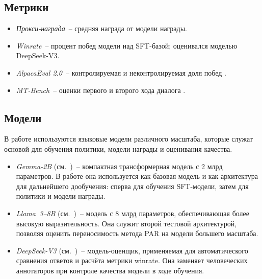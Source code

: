 \subsection{Метрики}

\begin{itemize}
    \item \emph{Прокси-награда}~-- средняя награда от модели награды.
    \item \emph{Winrate}~-- процент побед модели над SFT-базой; оценивался 
    моделью DeepSeek-V3.
    \item \emph{AlpacaEval 2.0}~-- контролируемая и неконтролируемая доля 
    побед \cite{li2023alpacaeval}.
    \item \emph{MT-Bench}~-- оценки первого и второго хода диалога \cite{zheng2023judging}.
\end{itemize}

\subsection{Модели}

В работе используются языковые модели различного масштаба, которые 
служат основой для обучения политики, модели награды и оценивания качества.

\begin{itemize}

    \item \emph{Gemma-2B} (см.~\cite{google2024gemma})~--  
    компактная трансформерная модель с 2 млрд параметров.  
    В работе она используется как базовая модель и как архитектура для 
    дальнейшего дообучения: сперва для обучения SFT-модели, затем для политики 
    и модели награды.

    \item \emph{Llama~3--8B} (см.~\cite{meta2024llama3})~--  
    модель с 8 млрд параметров, обеспечивающая более высокую 
    выразительность. Она служит второй тестовой архитектурой, позволяя оценить 
    переносимость метода PAR на модели большего масштаба.

    \item \emph{DeepSeek-V3} (см.~\cite{deepseek2024v3})~--  
    модель-оценщик, применяемая для автоматического сравнения ответов 
    и расчёта метрики winrate. Она заменяет человеческих аннотаторов при 
    контроле качества модели в ходе обучения.

\end{itemize}
